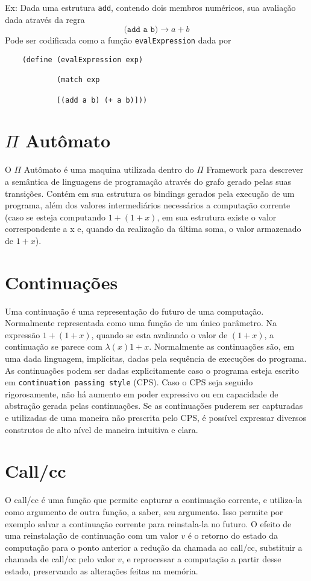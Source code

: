Ex:
    Dada uma estrutura \texttt{add}, contendo dois membros numéricos, sua avaliação dada através da regra
    $$(\texttt{add a b)} \xrightarrow{} a+b  $$
    Pode ser codificada como a função \texttt{evalExpression} dada por
    
    \begin{verbatim}
    (define (evalExpression exp)
    
            (match exp
            
            [(add a b) (+ a b)]))
    \end{verbatim}
    
\section{$\Pi$ Autômato}
O $\Pi$ Autômato é uma maquina utilizada dentro do $\Pi$ Framework para descrever a semântica de linguagens de programação através do grafo gerado pelas suas transições. Contém em sua estrutura os bindings gerados pela execução de um programa, além dos valores intermediários necessários a computação corrente (caso se esteja computando $1+(1+x)$, em sua estrutura existe o valor correspondente a x e, quando da realização da última soma, o valor armazenado de $1+x$).
\section{Continuações}
Uma continuação é uma representação do futuro de uma computação. Normalmente representada como uma função de um único parâmetro. Na expressão $1+(1+x)$, quando se esta avaliando o valor de $(1+x)$, a continuação se parece com $\lambda(x) 1+x$. Normalmente as continuações são, em uma dada linguagem, implícitas, dadas pela sequência de execuções do programa. As continuações podem ser dadas explicitamente caso o programa esteja escrito em \texttt{continuation passing style} (CPS). Caso o CPS seja seguido rigorosamente, não há aumento em poder expressivo ou em capacidade de abstração gerada pelas continuações. Se as continuações puderem ser capturadas e utilizadas de uma maneira não prescrita pelo CPS, é possível expressar diversos construtos de alto nível de maneira intuitiva e clara.

\section{Call/cc}

O call/cc é uma função que permite capturar a continuação corrente, e utiliza-la como argumento de outra função, a saber, seu argumento. Isso permite por exemplo salvar a continuação corrente para reinstala-la no futuro. O efeito de uma reinstalação de continuação com um valor $v$ é o retorno do estado da computação para o ponto anterior a redução da chamada ao call/cc, substituir a chamada de call/cc pelo valor $v$, e reprocessar a computação a partir desse estado, preservando as alterações feitas na memória.

